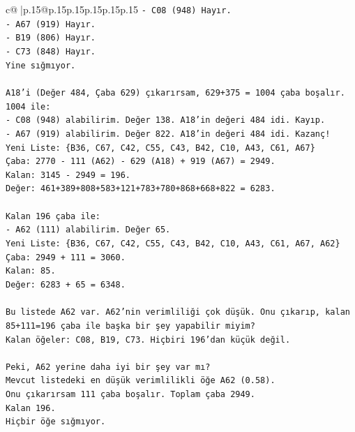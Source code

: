 \documentclass{article}
\begin{document}
{\begin{supertabular}{c@{$\;$}|p{.15\linewidth}@{}p{.15\linewidth}p{.15\linewidth}p{.15\linewidth}p{.15\linewidth}p{.15\linewidth}}
{{{\texttt{{-} C08 (948) Hayır.} \\
\texttt{{-} A67 (919) Hayır.} \\
\texttt{{-} B19 (806) Hayır.} \\
\texttt{{-} C73 (848) Hayır.} \\
\texttt{Yine sığmıyor.} \\
\\ 
\texttt{A18'i (Değer 484, Çaba 629) çıkarırsam, 629+375 = 1004 çaba boşalır.} \\
\texttt{1004 ile:} \\
\texttt{{-} C08 (948) alabilirim. Değer 138. A18'in değeri 484 idi. Kayıp.} \\
\texttt{{-} A67 (919) alabilirim. Değer 822. A18'in değeri 484 idi. Kazanç!} \\
\texttt{Yeni Liste: \{B36, C67, C42, C55, C43, B42, C10, A43, C61, A67\}} \\
\texttt{Çaba: 2770 {-} 111 (A62) {-} 629 (A18) + 919 (A67) = 2949.} \\
\texttt{Kalan: 3145 {-} 2949 = 196.} \\
\texttt{Değer: 461+389+808+583+121+783+780+868+668+822 = 6283.} \\
\\ 
\texttt{Kalan 196 çaba ile:} \\
\texttt{{-} A62 (111) alabilirim. Değer 65.} \\
\texttt{Yeni Liste: \{B36, C67, C42, C55, C43, B42, C10, A43, C61, A67, A62\}} \\
\texttt{Çaba: 2949 + 111 = 3060.} \\
\texttt{Kalan: 85.} \\
\texttt{Değer: 6283 + 65 = 6348.} \\
\\ 
\texttt{Bu listede A62 var. A62'nin verimliliği çok düşük. Onu çıkarıp, kalan 85+111=196 çaba ile başka bir şey yapabilir miyim?} \\
\texttt{Kalan öğeler: C08, B19, C73. Hiçbiri 196'dan küçük değil.} \\
\\ 
\texttt{Peki, A62 yerine daha iyi bir şey var mı?} \\
\texttt{Mevcut listedeki en düşük verimlilikli öğe A62 (0.58).} \\
\texttt{Onu çıkarırsam 111 çaba boşalır. Toplam çaba 2949.} \\
\texttt{Kalan 196.} \\
\texttt{Hiçbir öğe sığmıyor.} \\
\\ 
}}}
\end{supertabular}}
\end{document}

